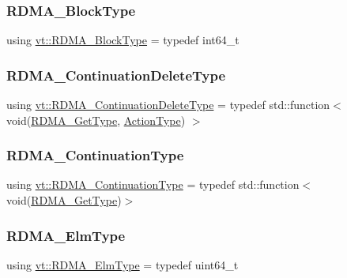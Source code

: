 \subsubsection{\texorpdfstring{R\+D\+M\+A\+\_\+\+Block\+Type}{RDMA\_BlockType}}
{\footnotesize\ttfamily using \hyperlink{namespacevt_ae54d2ca8f6bb4d65faf65118c82cd6f7}{vt\+::\+R\+D\+M\+A\+\_\+\+Block\+Type} = typedef int64\+\_\+t}

\mbox{\label{namespacevt_a4dfad0b5809d9812d60a0311a45ae0c2}} 
\subsubsection{\texorpdfstring{R\+D\+M\+A\+\_\+\+Continuation\+Delete\+Type}{RDMA\_ContinuationDeleteType}}
{\footnotesize\ttfamily using \hyperlink{namespacevt_a4dfad0b5809d9812d60a0311a45ae0c2}{vt\+::\+R\+D\+M\+A\+\_\+\+Continuation\+Delete\+Type} = typedef std\+::function$<$ void(\hyperlink{namespacevt_a1cab7f4860f65a49ad2c042d6240f288}{R\+D\+M\+A\+\_\+\+Get\+Type}, \hyperlink{namespacevt_ae0a5a7b18cc99d7b732cb4d44f46b0f3}{Action\+Type}) $>$}

\mbox{\label{namespacevt_a9880273f1697d78c2171f8d8f044de51}} 
\subsubsection{\texorpdfstring{R\+D\+M\+A\+\_\+\+Continuation\+Type}{RDMA\_ContinuationType}}
{\footnotesize\ttfamily using \hyperlink{namespacevt_a9880273f1697d78c2171f8d8f044de51}{vt\+::\+R\+D\+M\+A\+\_\+\+Continuation\+Type} = typedef std\+::function$<$void(\hyperlink{namespacevt_a1cab7f4860f65a49ad2c042d6240f288}{R\+D\+M\+A\+\_\+\+Get\+Type})$>$}

\mbox{\label{namespacevt_a2c2a902092b72056f70210c159f966f0}} 
\subsubsection{\texorpdfstring{R\+D\+M\+A\+\_\+\+Elm\+Type}{RDMA\_ElmType}}
{\footnotesize\ttfamily using \hyperlink{namespacevt_a2c2a902092b72056f70210c159f966f0}{vt\+::\+R\+D\+M\+A\+\_\+\+Elm\+Type} = typedef uint64\+\_\+t}

